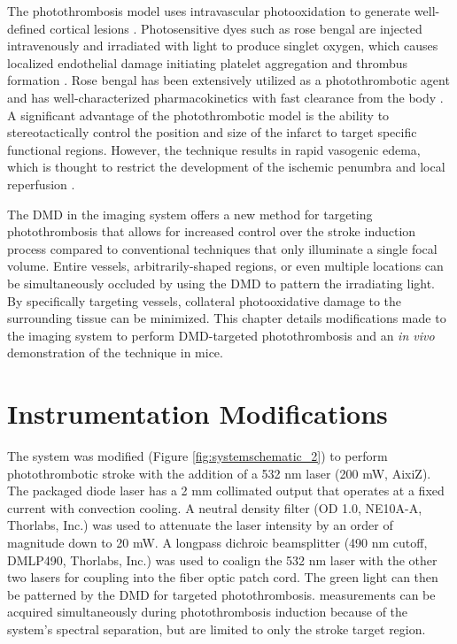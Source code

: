 The photothrombosis model uses intravascular photooxidation to generate well-defined cortical lesions \cite{Watson:1985bp}. Photosensitive dyes such as rose bengal are injected intravenously and irradiated with light to produce singlet oxygen, which causes localized endothelial damage initiating platelet aggregation and thrombus formation \cite{Dietrich:1987wh}. Rose bengal has been extensively utilized as a photothrombotic agent \cite{Grome:1988bx, Parthasarathy:2010vo} and has well-characterized pharmacokinetics with fast clearance from the body \cite{Klaassen:1976kg}. A significant advantage of the photothrombotic model is the ability to stereotactically control the position and size of the infarct to target specific functional regions. However, the technique results in rapid vasogenic edema, which is thought to restrict the development of the ischemic penumbra and local reperfusion \cite{Carmichael:2005gk}.

The DMD in the imaging system offers a new method for targeting photothrombosis that allows for increased control over the stroke induction process compared to conventional techniques that only illuminate a single focal volume. Entire vessels, arbitrarily-shaped regions, or even multiple locations can be simultaneously occluded by using the DMD to pattern the irradiating light. By specifically targeting vessels, collateral photooxidative damage to the surrounding tissue can be minimized. This chapter details modifications made to the imaging system to perform DMD-targeted photothrombosis and an \textit{in vivo} demonstration of the technique in mice.



\section{Instrumentation Modifications}

The system was modified (Figure \ref{fig:systemschematic_2}) to perform photothrombotic stroke with the addition of a 532 nm laser (200 mW, AixiZ). The packaged diode laser has a 2 mm collimated output that operates at a fixed current with convection cooling. A neutral density filter (OD 1.0, NE10A-A, Thorlabs, Inc.) was used to attenuate the laser intensity by an order of magnitude down to 20 mW. A longpass dichroic beamsplitter (490 nm cutoff, DMLP490, Thorlabs, Inc.) was used to coalign the 532 nm laser with the other two lasers for coupling into the fiber optic patch cord. The green light can then be patterned by the DMD for targeted photothrombosis.  measurements can be acquired simultaneously during photothrombosis induction because of the system's spectral separation, but are limited to only the stroke target region.

